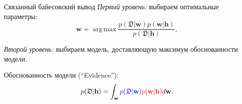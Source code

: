 \documentclass[usenames,dvipsnames,10pt,pdf,utf8,russian,aspectratio=43]{beamer}
\DeclareMathOperator*{\argmax}{arg\,max}
\begin{document}
\begin{frame}{Связанный байесовский вывод}
\textit{Первый уровень:} выбираем оптимальные параметры:
\[
    \mathbf{w} = \argmax \frac{p(\mathfrak{D}|\mathbf{w})p(\mathbf{w}|\mathbf{h})}{p(\mathfrak{D}|\mathbf{h})},
\]

\textit{Второй уровень:} выбираем модель, доставляющую максимум обоснованности модели.

Обоснованность модели (``Evidence''):
\[
	p(\mathfrak{D}|\mathbf{h}) = \int_\mathbf{w} \textcolor{blue}{p(\mathfrak{D}|\mathbf{w})}\textcolor{red}{p(\mathbf{w}|\mathbf{h})} d\mathbf{w}.
\]


\begin{figure}
  \centering
\label{fig:1}\qquad

\end{figure}


\end{frame}
\end{document}
